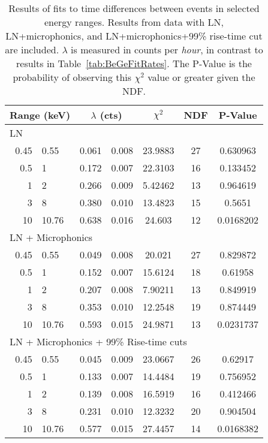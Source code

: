 			\begin{table}
				\centering
				\begin{tabular}{r@{$~\to~$}l  r@{$~\pm~$}l   c  c  c} 
					\multicolumn{2}{c}{Range (keV)} & \multicolumn{2}{c}{$\lambda$ (cts)} & $\chi^2$ & NDF & P-Value \\
					\hline
					\multicolumn{7}{l}{LN} \\
					\hline
					0.45 & 0.55 & 0.061 & 0.008 & 23.9883 & 27 & 0.630963 \\
					0.5 & 1 & 0.172 & 0.007 & 22.3103 & 16 & 0.133452 \\
					1 & 2 & 0.266 & 0.009 & 5.42462 & 13 & 0.964619 \\
					3 & 8 & 0.380 & 0.010 & 13.4823 & 15 & 0.5651 \\
					10 & 10.76 & 0.638 & 0.016 & 24.603 & 12 & 0.0168202 \\
					\hline
					\multicolumn{7}{l}{LN + Microphonics} \\
					\hline
					0.45 & 0.55 & 0.049 & 0.008 & 20.021 & 27 & 0.829872 \\
					0.5 & 1 & 0.152 & 0.007 & 15.6124 & 18 & 0.61958 \\
					1 & 2 & 0.207 & 0.008 & 7.90211 & 13 & 0.849919 \\
					3 & 8 & 0.353 & 0.010 & 12.2548 & 19 & 0.874449 \\
					10 & 10.76 & 0.593 & 0.015 & 24.9871 & 13 & 0.0231737 \\
					\hline
					\multicolumn{7}{l}{LN + Microphonics + 99\% Rise-time cuts} \\
					\hline
					0.45 & 0.55 & 0.045 & 0.009 & 23.0667 & 26 & 0.62917 \\
					0.5 & 1 & 0.133 & 0.007 & 14.4484 & 19 & 0.756952 \\
					1 & 2 & 0.139 & 0.008 & 16.5919 & 16 & 0.412466 \\
					3 & 8 & 0.231 & 0.010 & 12.3232 & 20 & 0.904504 \\
					10 & 10.76 & 0.577 & 0.015 & 27.4457 & 14 & 0.0168382 \\
					\hline
				\end{tabular}
				\caption[Results of fits to time differences between events in selected energy ranges]
				{Results of fits to time differences between events in selected energy ranges.  Results from data with LN, LN+microphonics, and LN+microphonics+99\% 
				rise-time cut are included.  $\lambda$ is measured in counts per \emph{hour}, in contrast to results in Table~\ref{tab:BeGeFitRates}. 
				The P-Value is the probability of observing this $\chi^{2}$ value or greater given the NDF.}
				\label{tab:BeGeFitExp}
			\end{table}


